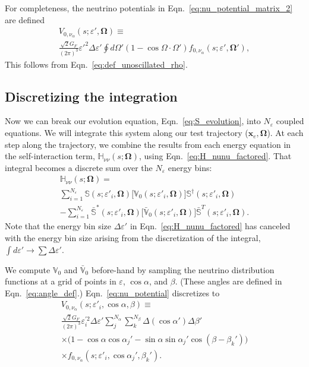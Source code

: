 \documentclass[aps,prd,twocolumn,superscriptaddress,groupedaddress]{revtex4}
\begin{document}
For completeness, the neutrino potentials in
Eqn.~\ref{eq:nu_potential_matrix_2} are defined
\begin{multline}
  \label{eq:nu_potential}
  V_{0,\nu_\alpha}(s;\varepsilon',\bm{\Omega}) \equiv \\
  \frac{\sqrt{2} G_F}{(2\pi)^3}\varepsilon'^2 \Delta\varepsilon'
  \oint d\Omega'
  (1-\cos\Omega\cdot\Omega')
  f_{0,\nu_\alpha}(s;\varepsilon',\bm{\Omega}'),
\end{multline}
This follows from Eqn.~\ref{eq:def_unoscillated_rho}.

\subsection*{Discretizing the integration}
Now we can break our evolution equation, Eqn.~\ref{eq:S_evolution},
into $N_\varepsilon$ coupled equations.
We will integrate this system along our test trajectory
($\bm{x}_e,\bm{\Omega}$).
At each step along the trajectory,
we combine the results from each energy equation in the self-interaction term,
$\mathbb{H}_{\nu\nu}(s;\bm{\Omega})$, using Eqn.~\ref{eq:H_nunu_factored}.
That integral becomes a discrete sum over the $N_\varepsilon$ energy bins:
\begin{multline}
  \label{eq:H_nunu_sum}
  \mathbb{H}_{\nu\nu}(s;\bm{\Omega}) = \\
  \sum\limits_{i=1}^{N_\varepsilon}
  \mathbb{S}(s;\varepsilon'_i,\bm{\Omega})
  \big[
    \mathbb{V}_0(s;\varepsilon'_i,\bm{\Omega})
    \big]
  \mathbb{S}^\dagger(s;\varepsilon'_i,\bm{\Omega}) \\
  - \sum\limits_{i=1}^{N_\varepsilon}
  \bar{\mathbb{S}}^*(s;\varepsilon'_i,\bm{\Omega})
  \big[
    \bar{\mathbb{V}}_0(s;\varepsilon'_i,\bm{\Omega})
    \big]
  \bar{\mathbb{S}}^T(s;\varepsilon'_i,\bm{\Omega}).
\end{multline}
Note that the energy bin size $\Delta\varepsilon'$ in
Eqn.~\ref{eq:H_nunu_factored} has canceled with the energy bin size arising from
the discretization of the integral,
$\int d\varepsilon' \rightarrow \sum \Delta\varepsilon'$.

We compute $\mathbb{V}_0$ and $\bar{\mathbb{V}}_0$ before-hand by sampling
the neutrino distribution functions at a grid of points in $\varepsilon$,
$\cos\alpha$, and $\beta$.
(These angles are defined in Eqn.~\ref{eq:angle_def}.)
Eqn.~\ref{eq:nu_potential} discretizes to
\begin{multline}
  \label{eq:nu_potential_sum}
  V_{0,\nu_\alpha}(s;\varepsilon'_i,\cos\alpha,\beta) \equiv \\
  \frac{\sqrt{2} G_F}{(2\pi)^3}\varepsilon_i^{'2} \Delta\varepsilon'
  \sum\limits_j^{N_\alpha} \sum\limits_k^{N_\beta}
  \Delta(\cos\alpha') \Delta\beta'\\
  \times \big(1-\cos\alpha\cos\alpha_j'-\sin\alpha\sin\alpha_j'\cos(\beta-\beta_k')\big)\\
  \times f_{0,\nu_\alpha}(s;\varepsilon'_i,\cos\alpha_j',\beta_k').
\end{multline}
\end{document}
